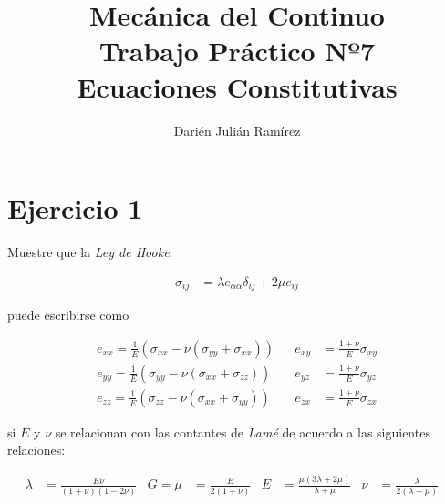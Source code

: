 \documentclass[a4paper,10pt,twoside,final,spanish]{article}
\title{\Huge Mecánica del Continuo \\
			 Trabajo Práctico Nº7  \\
			 Ecuaciones Constitutivas}
\author{Darién Julián Ramírez}
\date{}
\begin{document}
\maketitle %

\section*{Ejercicio 1}

Muestre que la \textit{Ley de Hooke}:

\begin{align*}
\sigma_{ij} &= \lambda e_{\alpha\alpha}\delta_{ij}+2\mu e_{ij}
\end{align*}

puede escribirse como

\begin{align*}
e_{xx}=\frac{1}{E}(\sigma_{xx}-\nu(\sigma_{yy}+\sigma_{xx}))
&& e_{xy} &= \frac{1+\nu}{E}\sigma_{xy} \\
e_{yy}=\frac{1}{E}(\sigma_{yy}-\nu(\sigma_{xx}+\sigma_{zz}))
&& e_{yz} &= \frac{1+\nu}{E}\sigma_{yz} \\
e_{zz}=\frac{1}{E}(\sigma_{zz}-\nu(\sigma_{xx}+\sigma_{yy}))
&& e_{zx} &= \frac{1+\nu}{E}\sigma_{zx}
\end{align*}

si $E$ y $\nu$ se relacionan con las contantes de \textit{Lamé} de acuerdo a las siguientes relaciones:

\begin{align*}
\lambda &= \frac{E\nu}{(1+\nu)(1-2\nu)}           &
G=\mu   &= \frac{E}{2(1+\nu)}                     &
E       &= \frac{\mu(3\lambda+2\mu)}{\lambda+\mu} &
\nu     &= \frac{\lambda}{2(\lambda+\mu)}         &
\end{align*}

\dotfill
\end{document}
